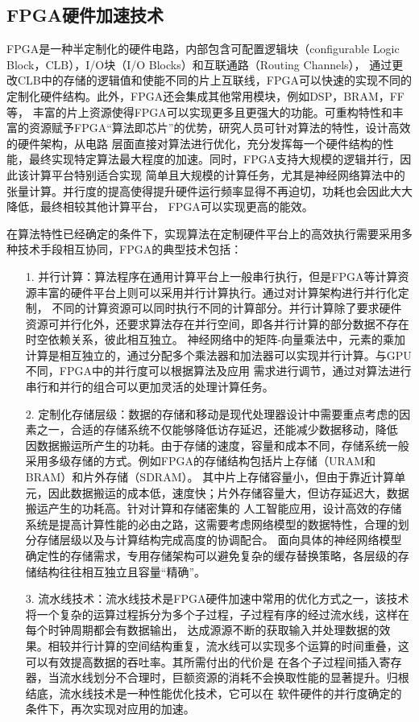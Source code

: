 \subsection{FPGA硬件加速技术}

FPGA是一种半定制化的硬件电路，内部包含可配置逻辑块（configurable Logic Block，CLB），I/O块（I/O Blocks）和互联通路（Routing Channels），
通过更改CLB中的存储的逻辑值和使能不同的片上互联线，FPGA可以快速的实现不同的定制化硬件结构。此外，FPGA还会集成其他常用模块，例如DSP，BRAM，FF等，
丰富的片上资源使得FPGA可以实现更多且更强大的功能。可重构特性和丰富的资源赋予FPGA“算法即芯片”的优势，研究人员可针对算法的特性，设计高效的硬件架构，从电路
层面直接对算法进行优化，充分发挥每一个硬件结构的性能，最终实现特定算法最大程度的加速。同时，FPGA支持大规模的逻辑并行，因此该计算平台特别适合实现
简单且大规模的计算任务，尤其是神经网络算法中的张量计算。并行度的提高使得提升硬件运行频率显得不再迫切，功耗也会因此大大降低，最终相较其他计算平台，
FPGA可以实现更高的能效。

在算法特性已经确定的条件下，实现算法在定制硬件平台上的高效执行需要采用多种技术手段相互协同，FPGA的典型技术包括：

\begin{itemize}
\vspace{8pt}
\item[1.]并行计算：算法程序在通用计算平台上一般串行执行，但是FPGA等计算资源丰富的硬件平台上则可以采用并行计算执行。通过对计算架构进行并行化定制，
不同的计算资源可以同时执行不同的计算部分。并行计算除了要求硬件资源可并行化外，还要求算法存在并行空间，即各并行计算的部分数据不存在时空依赖关系，彼此相互独立。
神经网络中的矩阵-向量乘法中，元素的乘加计算是相互独立的，通过分配多个乘法器和加法器可以实现并行计算。与GPU不同，FPGA中的并行度可以根据算法及应用
需求进行调节，通过对算法进行串行和并行的组合可以更加灵活的处理计算任务。
\vspace{8pt}
\item[2.]定制化存储层级：数据的存储和移动是现代处理器设计中需要重点考虑的因素之一，合适的存储系统不仅能够降低访存延迟，还能减少数据移动，降低
因数据搬运所产生的功耗。由于存储的速度，容量和成本不同，存储系统一般采用多级存储的方式。例如FPGA的存储结构包括片上存储（URAM和BRAM）和片外存储（SDRAM）。
其中片上存储容量小，但由于靠近计算单元，因此数据搬运的成本低，速度快；片外存储容量大，但访存延迟大，数据搬运产生的功耗高。针对计算和存储密集的
人工智能应用，设计高效的存储系统是提高计算性能的必由之路，这需要考虑网络模型的数据特性，合理的划分存储层级以及与计算结构完成高度的协调配合。
面向具体的神经网络模型确定性的存储需求，专用存储架构可以避免复杂的缓存替换策略，各层级的存储结构往往相互独立且容量“精确”。
\vspace{8pt}
\item[3.]流水线技术：流水线技术是FPGA硬件加速中常用的优化方式之一，该技术将一个复杂的运算过程拆分为多个子过程，子过程有序的经过流水线，这样在每个时钟周期都会有数据输出，
达成源源不断的获取输入并处理数据的效果。相较并行计算的空间结构重复，流水线可以实现多个运算的时间重叠，这可以有效提高数据的吞吐率。其所需付出的代价是
在各个子过程间插入寄存器，当流水线划分不合理时，巨额资源的消耗不会换取性能的显著提升。归根结底，流水线技术是一种性能优化技术，它可以在
软件硬件的并行度确定的条件下，再次实现对应用的加速。

\end{itemize}
